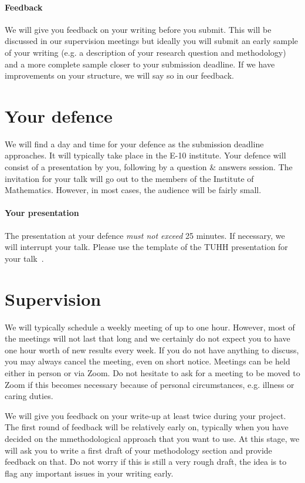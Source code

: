 \documentclass[conference]{IEEEtran}
\begin{document}
\paragraph{Feedback} We will give you feedback on your writing before you submit.
This will be discussed in our supervision meetings but ideally you will submit an early sample of your writing (e.g. a description of your research question and methodology) and a more complete sample closer to your submission deadline.
If we have improvements on your structure, we will say so in our feedback.

\section{Your defence}
We will find a day and time for your defence as the submission deadline approaches.
It will typically take place in the E-10 institute.
Your defence will consist of a presentation by you, following by a question \& answers session.
The invitation for your talk will go out to the members of the Institute of Mathematics.
However, in most cases, the audience will be fairly small.

\paragraph{Your presentation}
The presentation at your defence \emph{must not exceed} 25 minutes.
If necessary, we will interrupt your talk.
Please use the template of the TUHH presentation for your talk~\cite{tuhh}.

\section{Supervision}
We will typically schedule a weekly meeting of up to one hour.
However, most of the meetings will not last that long and we certainly do not expect you to have one hour worth of new results every week.
If you do not have anything to discuss, you may always cancel the meeting, even on short notice. 
Meetings can be held either in person or via Zoom.
Do not hesitate to ask for a meeting to be moved to Zoom if this becomes necessary because of personal circumstances, e.g. illness or caring duties.

We will give you feedback on your write-up at least twice during your project.
The first round of feedback will be relatively early on, typically when you have decided on the mmethodological approach that you want to use.
At this stage, we will ask you to write a first draft of your methodology section and provide feedback on that.
Do not worry if this is still a very rough draft, the idea is to flag any important issues in your writing early.
\end{document}

